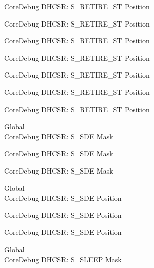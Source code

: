 \begin{DoxyRefList}
\label{deprecated__deprecated000111}%
%
Core\+Debug DHCSR\+: S\+\_\+\+RETIRE\+\_\+\+ST Position 

\label{deprecated__deprecated000165}%
%
Core\+Debug DHCSR\+: S\+\_\+\+RETIRE\+\_\+\+ST Position 

\label{deprecated__deprecated000250}%
%
Core\+Debug DHCSR\+: S\+\_\+\+RETIRE\+\_\+\+ST Position 

\label{deprecated__deprecated000307}%
%
Core\+Debug DHCSR\+: S\+\_\+\+RETIRE\+\_\+\+ST Position 

\label{deprecated__deprecated000383}%
%
Core\+Debug DHCSR\+: S\+\_\+\+RETIRE\+\_\+\+ST Position 

\label{deprecated__deprecated000462}%
%
Core\+Debug DHCSR\+: S\+\_\+\+RETIRE\+\_\+\+ST Position 

\label{deprecated__deprecated000564}%
%
Core\+Debug DHCSR\+: S\+\_\+\+RETIRE\+\_\+\+ST Position  
\item[Global \doxylink{group___c_m_s_i_s___s_c_b_ga67f2b2b6729ab2db89f97bbe75224e9d}{Core\+Debug\+\_\+\+DHCSR\+\_\+\+S\+\_\+\+SDE\+\_\+\+Msk} ]\hfill \\
\label{deprecated__deprecated000020}%
%
Core\+Debug DHCSR\+: S\+\_\+\+SDE Mask 

\label{deprecated__deprecated000471}%
%
Core\+Debug DHCSR\+: S\+\_\+\+SDE Mask 

\label{deprecated__deprecated000573}%
%
Core\+Debug DHCSR\+: S\+\_\+\+SDE Mask  
\item[Global \doxylink{group___c_m_s_i_s___s_c_b_ga34b00f5a0109d236647be6609d6f04b3}{Core\+Debug\+\_\+\+DHCSR\+\_\+\+S\+\_\+\+SDE\+\_\+\+Pos} ]\hfill \\
\label{deprecated__deprecated000019}%
%
Core\+Debug DHCSR\+: S\+\_\+\+SDE Position 

\label{deprecated__deprecated000470}%
%
Core\+Debug DHCSR\+: S\+\_\+\+SDE Position 

\label{deprecated__deprecated000572}%
%
Core\+Debug DHCSR\+: S\+\_\+\+SDE Position  
\item[Global \doxylink{group___c_m_s_i_s___core_debug_ga98d51538e645c2c1a422279cd85a0a25}{Core\+Debug\+\_\+\+DHCSR\+\_\+\+S\+\_\+\+SLEEP\+\_\+\+Msk} ]\hfill \\
\label{deprecated__deprecated000024}%
%
Core\+Debug DHCSR\+: S\+\_\+\+SLEEP Mask 


\end{DoxyRefList}
